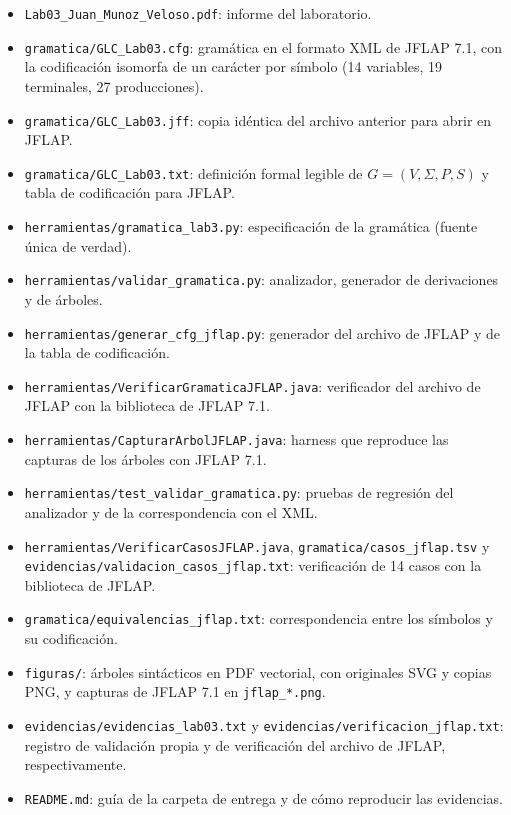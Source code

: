 \documentclass[11pt,letterpaper]{article}
\begin{document}
\begin{itemize}
  \item \texttt{Lab03\_Juan\_Munoz\_Veloso.pdf}: informe del laboratorio.
  \item \texttt{gramatica/\allowbreak GLC\_Lab03.cfg}: gramática en el formato XML de JFLAP 7.1, con
  la codificación isomorfa de un carácter por símbolo (14 variables, 19 terminales, 27 producciones).
  \item \texttt{gramatica/\allowbreak GLC\_Lab03.jff}: copia idéntica del archivo anterior para abrir en JFLAP.
  \item \texttt{gramatica/\allowbreak GLC\_Lab03.txt}: definición formal legible de $G=(V,\Sigma,P,S)$
  y tabla de codificación para JFLAP.
  \item \texttt{herramientas/\allowbreak gramatica\_lab3.py}: especificación de la gramática (fuente única de
  verdad).
  \item \texttt{herramientas/\allowbreak validar\_gramatica.py}: analizador, generador de derivaciones y de
  árboles.
  \item \texttt{herramientas/\allowbreak generar\_cfg\_jflap.py}: generador del archivo de JFLAP y de
  la tabla de codificación.
  \item \texttt{herramientas/\allowbreak VerificarGramaticaJFLAP.\allowbreak java}: verificador del archivo de JFLAP con
  la biblioteca de JFLAP 7.1.
  \item \texttt{herramientas/\allowbreak CapturarArbolJFLAP.\allowbreak java}: harness que reproduce las capturas de los
  árboles con JFLAP 7.1.
  \item \texttt{herramientas/\allowbreak test\_validar\_gramatica.py}: pruebas de regresión del analizador y de la correspondencia con el XML.
  \item \texttt{herramientas/\allowbreak VerificarCasosJFLAP.java},
  \texttt{gramatica/\allowbreak casos\_jflap.tsv} y
  \texttt{evidencias/\allowbreak validacion\_casos\_jflap.txt}: verificación de 14 casos con la biblioteca de JFLAP.
  \item \texttt{gramatica/\allowbreak equivalencias\_jflap.txt}: correspondencia entre los símbolos y su codificación.
  \item \texttt{figuras/}: árboles sintácticos en PDF vectorial, con originales SVG y copias PNG, y
  capturas de JFLAP 7.1 en \texttt{jflap\_*.png}.
  \item \texttt{evidencias/\allowbreak evidencias\_lab03.txt} y \texttt{evidencias/\allowbreak verificacion\_jflap.txt}:
  registro de validación propia y de verificación del archivo de JFLAP, respectivamente.
  \item \texttt{README.md}: guía de la carpeta de entrega y de cómo reproducir las evidencias.
\end{itemize}
\end{document}
